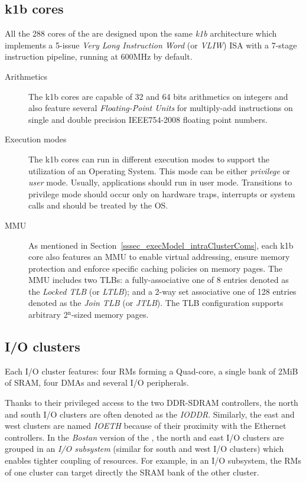 \documentclass[main.tex]{subfiles}
\begin{document}
\subsection{k1b cores}
All the 288 cores of the \mppalong are designed upon the same \emph{k1b}
architecture which implements a 5-issue \emph{Very Long Instruction Word} (or
\emph{VLIW}) ISA with a 7-stage instruction pipeline, running at 600MHz by
default. 

\begin{description}
    \item[Arithmetics]
        The k1b cores are capable of 32 and 64 bits arithmetics on integers and
        also feature several \emph{Floating-Point Units} for multiply-add
        instructions on single and double precision IEEE754-2008 floating point
        numbers.

    \item[Execution modes]
        The k1b cores can run in different execution modes to support the
        utilization of an Operating System. This mode can be either
        \emph{privilege} or \emph{user} mode. Usually, applications should run
        in user mode. Transitions to privilege mode should occur only on
        hardware traps, interrupts or system calls and should be treated by the
        OS.

    \item[MMU]
        As mentioned in Section~\ref{sssec_execModel_intraClusterComs}, each
        k1b core also features an MMU to enable virtual addressing, ensure
        memory protection and enforce specific caching policies on memory
        pages. The MMU includes two TLBs: a fully-associative one of 8 entries
        denoted as the \emph{Locked TLB} (or \emph{LTLB}); and a 2-way set
        associative one of 128 entries denoted as the \emph{Join TLB} (or
        \emph{JTLB}). The TLB configuration supports arbitrary
        2$^{\text{n}}$-sized memory pages.
\end{description}



\subsection{I/O clusters}
Each I/O cluster features: four RMs forming a Quad-core, a single bank of 2MiB
of SRAM, four DMAs and several I/O peripherals.

Thanks to their privileged access to the two DDR-SDRAM controllers, the north
and south I/O clusters are often denoted as the \emph{IODDR}. Similarly, the
east and west clusters are named \emph{IOETH} because of their proximity with
the Ethernet controllers. In the \emph{Bostan} version of the \mppalong, the
north and east I/O clusters are grouped in an \emph{I/O subsystem} (similar for
south and west I/O clusters) which enables tighter coupling of resources. For
example, in an I/O subsystem, the RMs of one cluster can target directly the
SRAM bank of the other cluster.
\end{document}
